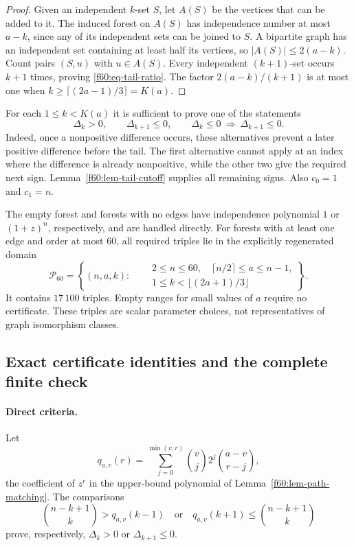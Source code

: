 \begin{proof}
Given an independent $k$-set $S$, let $A(S)$ be the vertices that can
be added to it.  The induced forest on $A(S)$ has independence number
at most $a-k$, since any of its independent sets can be joined to $S$.
A bipartite graph has an independent set containing at least half its
vertices, so $|A(S)|\le2(a-k)$.  Count pairs $(S,u)$ with $u\in A(S)$.
Every independent $(k+1)$-set occurs $k+1$ times, proving
\eqref{f60:eq-tail-ratio}.  The factor $2(a-k)/(k+1)$ is at most one
when $k\ge\lceil(2a-1)/3\rceil=K(a)$.
\end{proof}

For each $1\le k<K(a)$ it is sufficient to prove one of the statements
\begin{equation}
 \Delta_k>0,\qquad
 \Delta_{k+1}\le0,\qquad
 \Delta_k\le0\ \Longrightarrow\ \Delta_{k+1}\le0.
 \label{f60:eq-alternative}
\end{equation}
Indeed, once a nonpositive difference occurs, these alternatives
prevent a later positive difference before the tail.  The first
alternative cannot apply at an index where the difference is already
nonpositive, while the other two give the required next sign.
Lemma~\ref{f60:lem-tail-cutoff} supplies all remaining signs.  Also
$c_0=1$ and $c_1=n$.

The empty forest and forests with no edges have independence polynomial
$1$ or $(1+z)^n$, respectively, and are handled directly.  For forests
with at least one edge and order at most $60$, all required triples lie
in the explicitly regenerated domain
\begin{equation}
 \mathcal P_{60}=\left\{(n,a,k):\quad
 \begin{aligned}
 &2\le n\le60,\quad \lceil n/2\rceil\le a\le n-1,\\[-2pt]
 &1\le k<\lfloor(2a+1)/3\rfloor
 \end{aligned}\right\}.
 \label{f60:eq-domain}
\end{equation}
It contains $17\,100$ triples.  Empty ranges for small values of $a$
require no certificate.  These triples are scalar parameter choices,
not representatives of graph isomorphism classes.

\subsection{Exact certificate identities and the complete finite check}
\label{f60:subsec-certificates}

\paragraph{Direct criteria.}
Let
\begin{equation}
 q_{a,v}(r)=\sum_{j=0}^{\min(v,r)}\binom vj2^j\binom{a-v}{r-j},
 \label{f60:eq-q}
\end{equation}
the coefficient of $z^r$ in the upper-bound polynomial of
Lemma~\ref{f60:lem-path-matching}.  The comparisons
\[
 \binom{n-k+1}{k}>q_{a,v}(k-1)
 \quad\text{or}\quad
 q_{a,v}(k+1)\le\binom{n-k+1}{k}
\]
prove, respectively, $\Delta_k>0$ or $\Delta_{k+1}\le0$.

